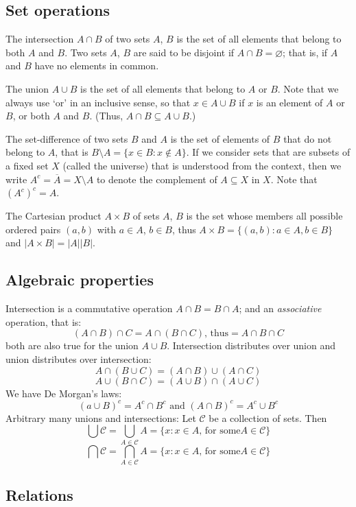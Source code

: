\documentclass{article}
\begin{document}
\subsection{Set operations}

The intersection $A\cap B$ of two sets $A$, $B$ is the set of all elements that belong to both $A$ and $B$. Two sets $A$, $B$ are said to be disjoint if $A\cap B = \varnothing $; that is, if $A$ and $B$ have no elements in common.

The union $A \cup B$ is the set of all elements that belong to $A$ or $B$. Note that we always use ‘or’ in an inclusive sense, so that $x \in A \cup B$ if $x$ is an element of $A$ or $B$, or both $A$ and $B$. (Thus, $A \cap B \subseteq A \cup B$.)

The set-difference of two sets $B$ and $A$ is the set of elements of $B$ that do not belong to $A$, that is $B \setminus A = \{x \in B:x \notin A\}$.
If we consider sets that are subsets of a fixed set $X$ (called the universe) that is understood from the context, then we write $A^c = \overline{A} = X \setminus A$ to denote the complement of $A \subseteq X$ in $X$. Note that $(A^c)^c = A$.

The Cartesian product $A \times B$ of sets $A$, $B$ is the set whose members all possible ordered pairs $(a, b)$ with $a\in A$, $b\in B$, thus $A\times B = \{(a,b):a\in A, b\in B \}$ and $|A\times B| = |A||B|$.

\subsection{Algebraic properties}

Intersection is a commutative operation $A\cap B = B \cap A$; and an \textit{associative} operation, that is:
\[
(A\cap B)\cap C = A \cap (B\cap C)\text{, thus} = A\cap B \cap C
\]
   both are also true for the union $A\cup B$.
Intersection distributes over union and union distributes over intersection:
\[
A\cap (B\cup C) = (A\cap B)\cup (A\cap C)
\]
\[
A\cup (B\cap C) = (A\cup B) \cap (A\cup C)
\]
We have De Morgan’s laws:
\[
(a\cup B)^c = A^c\cap B^c \text{ and } (A\cap B)^c = A^c\cup B^c
\]
Arbitrary many unions and intersections: Let $\mathcal{C}$ be a collection of sets. Then
\[
\bigcup\mathcal{C} = \bigcup_{A\in  \mathcal{C}}A = \{x: x \in A\text{, for some} A \in \mathcal{C}\}
\]
\[
\bigcap\mathcal{C} = \bigcap_{A\in  \mathcal{C}}A = \{x: x \in A\text{, for some} A \in \mathcal{C}\}
\]

\subsection{Relations}
\end{document}

